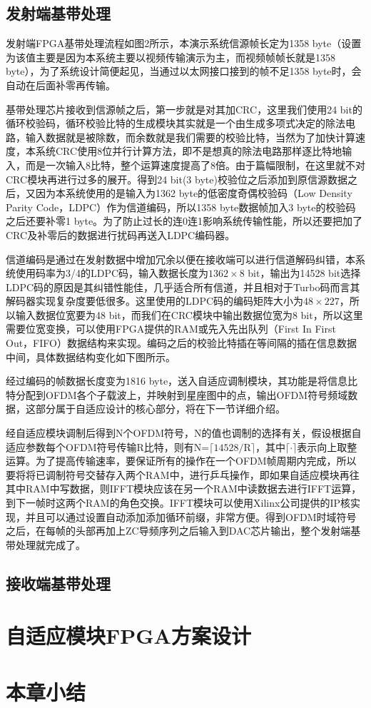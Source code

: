 \subsection{发射端基带处理}
发射端FPGA基带处理流程如图2所示，本演示系统信源帧长定为1358 byte（设置为该值主要是因为本系统主要以视频传输演示为主，而视频帧帧长就是1358 byte），为了系统设计简便起见，当通过以太网接口接到的帧不足1358 byte时，会自动在后面补零再传输。

基带处理芯片接收到信源帧之后，第一步就是对其加CRC，这里我们使用24 bit的循环校验码，循环校验比特的生成模块其实就是一个由生成多项式决定的除法电路，输入数据就是被除数，而余数就是我们需要的校验比特，当然为了加快计算速度，本系统CRC使用8位并行计算方法，即不是想真的除法电路那样逐比特地输入，而是一次输入8比特，整个运算速度提高了8倍。由于篇幅限制，在这里就不对CRC模块再进行过多的展开。得到24 bit(3 byte)校验位之后添加到原信源数据之后，又因为本系统使用的是输入为1362 byte的低密度奇偶校验码（Low Density Parity Code，LDPC）作为信道编码，所以1358 byte数据帧加入3 byte的校验码之后还要补零1 byte。为了防止过长的连0连1影响系统传输性能，所以还要把加了CRC及补零后的数据进行扰码再送入LDPC编码器。

信道编码是通过在发射数据中增加冗余以便在接收端可以进行信道解码纠错，本系统使用码率为3/4的LDPC码，输入数据长度为$1362\times 8$ bit，输出为14528 bit选择LDPC码的原因是其纠错性能佳，几乎适合所有信道，并且相对于Turbo码而言其解码器实现复杂度要低很多。这里使用的LDPC码的编码矩阵大小为$48\times 227$，所以输入数据位宽要为48 bit，而我们在CRC模块中输出数据位宽为8 bit，所以这里需要位宽变换，可以使用FPGA提供的RAM或先入先出队列（First In First Out，FIFO）数据结构来实现。编码之后的校验比特插在等间隔的插在信息数据中间，具体数据结构变化如下图所示。

经过编码的帧数据长度变为1816 byte，送入自适应调制模块，其功能是将信息比特分配到OFDM各个子载波上，并映射到星座图中的点，输出OFDM符号频域数据，这部分属于自适应设计的核心部分，将在下一节详细介绍。

经自适应模块调制后得到N个OFDM符号，N的值也调制的选择有关，假设根据自适应参数每个OFDM符号传输R比特，则有N=$\lceil 14528/\text{R} \rceil$，其中$\lceil \cdot \rceil$表示向上取整运算。为了提高传输速率，要保证所有的操作在一个OFDM帧周期内完成，所以要将将已调制符号交替存入两个RAM中，进行乒乓操作，即如果自适应模块再往其中RAM中写数据，则IFFT模块应该在另一个RAM中读数据去进行IFFT运算，到下一帧时这两个RAM的角色交换。IFFT模块可以使用Xilinx公司提供的IP核实现，并且可以通过设置自动添加添加循环前缀，非常方便。得到OFDM时域符号之后，在每帧的头部再加上ZC导频序列之后输入到DAC芯片输出，整个发射端基带处理就完成了。

\subsection{接收端基带处理}

\section{自适应模块FPGA方案设计}
\section{本章小结}